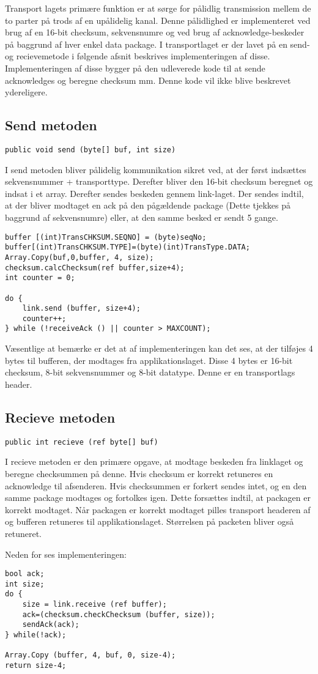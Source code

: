 Transport lagets primære funktion er at sørge for pålidlig transmission mellem de to parter på trods af en upålidelig kanal. 
Denne pålidlighed er implementeret ved brug af en 16-bit checksum, sekvensnumre og ved brug af acknowledge-beskeder på baggrund af hver enkel data package. 
I transportlaget er der lavet på en send- og recievemetode i følgende afsnit beskrives implementeringen af disse. Implementeringen af disse bygger på den udleverede kode til at sende acknowledges og beregne checksum mm. Denne kode vil ikke blive beskrevet ydereligere.

\subsection{Send metoden}
\begin{verbatim}
public void send (byte[] buf, int size)
\end{verbatim}
I send metoden bliver pålidelig kommunikation sikret ved, at der først indsættes sekvensnummer + transporttype. Derefter bliver den 16-bit checksum beregnet og indsat i et array. Derefter sendes beskeden gennem link-laget. Der sendes indtil, at der bliver modtaget en ack på den pågældende package (Dette tjekkes på baggrund af sekvensnumre) eller, at den samme besked er sendt 5 gange.
\begin{lstlisting}
buffer [(int)TransCHKSUM.SEQNO] = (byte)seqNo;
buffer[(int)TransCHKSUM.TYPE]=(byte)(int)TransType.DATA;
Array.Copy(buf,0,buffer, 4, size);
checksum.calcChecksum(ref buffer,size+4);
int counter = 0;

do {
	link.send (buffer, size+4);
	counter++;
} while (!receiveAck () || counter > MAXCOUNT);	
\end{lstlisting}

\noindent Væsentlige at bemærke er det at af implementeringen kan det ses, at der tilføjes 4 bytes til bufferen, der modtages fra applikationslaget. Disse 4 bytes er 16-bit checksum, 8-bit sekvensnummer og 8-bit datatype. Denne er en transportlags header. 

\subsection{Recieve metoden}
\begin{verbatim}
public int recieve (ref byte[] buf)
\end{verbatim}

I recieve metoden er den primære opgave, at modtage beskeden fra linklaget og beregne checksummen på denne. Hvis checksum er korrekt retuneres en acknowledge til afsenderen. Hvis checksummen er forkert sendes intet, og en den samme package modtages og fortolkes igen. Dette forsættes indtil, at packagen er korrekt modtaget. Når packagen er korrekt modtaget pilles transport headeren af og bufferen retuneres til applikationslaget. Størrelsen på packeten bliver også retuneret.

\noindent Neden for ses implementeringen:
\begin{lstlisting}
bool ack;
int size;
do {
	size = link.receive (ref buffer);
	ack=(checksum.checkChecksum (buffer, size));
	sendAck(ack);
} while(!ack);

Array.Copy (buffer, 4, buf, 0, size-4);
return size-4;
\end{lstlisting}